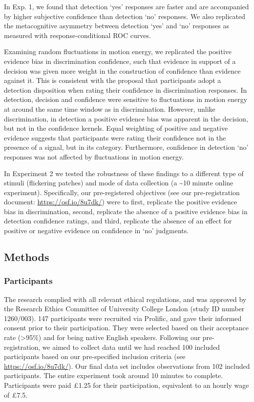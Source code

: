 \documentclass[12pt,twoside]{reedthesis}
\begin{document}
In Exp. 1, we found that detection `yes' responses are faster and are accompanied by higher subjective confidence than detection `no' responses. We also replicated the metacognitive asymmetry between detection `yes' and `no' responses as measured with response-conditional ROC curves.

Examining random fluctuations in motion energy, we replicated the positive evidence bias in discrimination confidence, such that evidence in support of a decision was given more weight in the construction of confidence than evidence against it. This is consistent with the proposal that participants adopt a detection disposition when rating their confidence in discrimination responses. In detection, decision and confidence were sensitive to fluctuations in motion energy at around the same time window as in discrimination. However, unlike discrimination, in detection a positive evidence bias was apparent in the decision, but not in the confidence kernels. Equal weighting of positive and negative evidence suggests that participants were rating their confidence not in the presence of a signal, but in its category. Furthermore, confidence in detection `no' responses was not affected by fluctuations in motion energy.

In Experiment 2 we tested the robustness of these findings to a different type of stimuli (flickering patches) and mode of data collection (a \textasciitilde10 minute online experiment). Specifically, our pre-registered objectives (see our pre-registration document: \url{https://osf.io/8u7dk/}) were to first, replicate the positive evidence bias in discrimination, second, replicate the absence of a positive evidence bias in detection confidence ratings, and third, replicate the absence of an effect for positive or negative evidence on confidence in `no' judgments.

\hypertarget{methods-1}{%
\subsection{Methods}\label{methods-1}}

\hypertarget{participants-6}{%
\subsubsection{Participants}\label{participants-6}}

The research complied with all relevant ethical regulations, and was approved by the Research Ethics Committee of University College London (study ID number 1260/003). 147 participants were recruited via Prolific, and gave their informed consent prior to their participation. They were selected based on their acceptance rate (\textgreater95\%) and for being native English speakers. Following our pre-registration, we aimed to collect data until we had reached 100 included participants based on our pre-specified inclusion criteria (see \url{https://osf.io/8u7dk/}). Our final data set includes observations from 102 included participants. The entire experiment took around 10 minutes to complete. Participants were paid £1.25 for their participation, equivalent to an hourly wage of £7.5.
\end{document}
